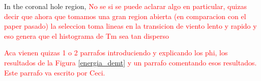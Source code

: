 \documentclass[namedreferences]{solarphysics}
\begin{document}
\begin{article}
In the coronal hole region, \textcolor{red}{No se si se puede aclarar algo en particular, quizas decir que ahora que tomamos una gran region abierta (en comparacion con el paper pasado) la seleccion toma lineas en la transicion de viento lento y rapido y eso genera que el histograma de Tm sea tan disperso}



\textcolor{red}{Aca vienen quizas 1 o 2 parrafos introduciendo y explicando los phi, los resultados de la Figura \ref{energia_demt} y un parrafo comentando esos resultados. Este parrafo va escrito por Ceci.}



\end{article}
\end{document}
